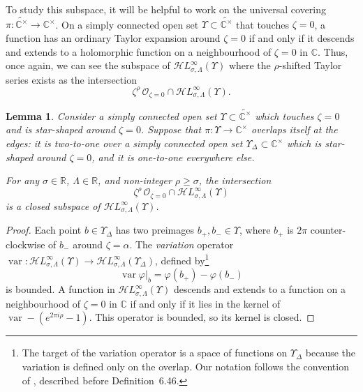 \documentclass{article}
\newcommand{\singexp}[2]{\mathcal{H}L^\infty_{#1, #2}}
\newcommand{\maps}{\colon}
\newcommand{\R}{\mathbb{R}}
\newcommand{\C}{\mathbb{C}}
\DeclareMathOperator{\var}{var}
\theoremstyle{definition}
\theoremstyle{plain}
\newtheorem{lemma}[definition]{Lemma}
\begin{document}
To study this subspace, it will be helpful to work on the universal covering $\pi \maps \widetilde{\C^\times} \to \C^\times$. On a simply connected open set $\Upsilon \subset \widetilde{\C^\times}$ that touches $\zeta = 0$, a function has an ordinary Taylor expansion around $\zeta = 0$ if and only if it descends and extends to a holomorphic function on a neighbourhood of $\zeta = 0$ in $\C$. Thus, once again, we can see the subspace of $\singexp{\sigma}{\Lambda}(\Upsilon)$ where the $\rho$-shifted Taylor series exists as the intersection
\[ \zeta^\rho\,\mathcal{O}_{\zeta = 0} \cap \singexp{\sigma}{\Lambda}(\Upsilon). \]
\begin{lemma}\label{lem:shifted_holo_closed}
Consider a simply connected open set $\Upsilon \subset \widetilde{\C^\times}$ which touches $\zeta = 0$ and is star-shaped around $\zeta = 0$. Suppose that $\pi \maps \Upsilon \to \C^\times$ overlaps itself at the edges: it is two-to-one over a simply connected open set $\Upsilon_\Delta \subset \C^\times$ which is star-shaped around $\zeta = 0$, and it is one-to-one everywhere else.
\begin{center}
\label{fig:domain_Upsilon}
\end{center}
For any $\sigma \in \R$, $\Lambda \in \R$, and non-integer $\rho \ge \sigma$, the intersection
\[ \zeta^\rho\,\mathcal{O}_{\zeta = 0} \cap \singexp{\sigma}{\Lambda}(\Upsilon) \]
is a closed subspace of $\singexp{\sigma}{\Lambda}(\Upsilon)$.
\end{lemma}
\begin{proof}
Each point $b \in \Upsilon_\Delta$ has two preimages $b_+, b_- \in \Upsilon$, where $b_+$ is $2\pi$ counter-clockwise of $b_-$ around $\zeta = \alpha$. The {\em variation} operator $\var \maps \singexp{\sigma}{\Lambda}(\Upsilon) \to \singexp{\sigma}{\Lambda}(\Upsilon_\Delta)$, defined by\footnote{The target of the variation operator is a space of functions on $\Upsilon_\Delta$ because the variation is defined only on the overlap. Our notation follows the convention of \cite{diverg-resurg-i}, described before Definition~6.46.}
\[ \var \varphi \big|_b = \varphi(b_+) - \varphi(b_-) \]
is bounded. A function in $\singexp{\sigma}{\Lambda}(\Upsilon)$ descends and extends to a function on a neighbourhood of $\zeta = 0$ in $\C$ if and only if it lies in the kernel of $\var - (e^{2\pi i \rho} - 1)$. This operator is bounded, so its kernel is closed.
\end{proof}
\end{document}
